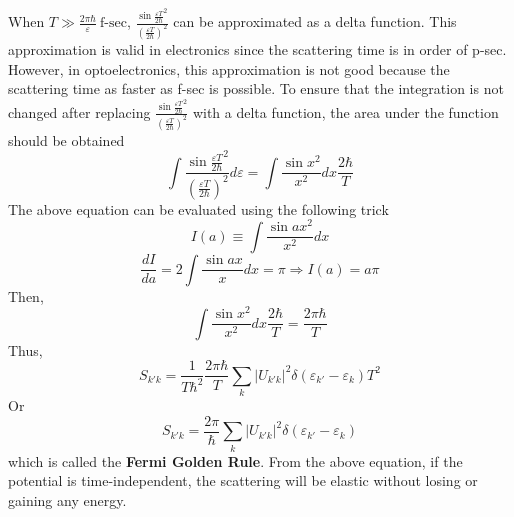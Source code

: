 When $T \gg \frac{2\pi\hbar}{\varepsilon} ~ \text{f-sec}$, $\frac{\sin{\frac{\varepsilon T}{2\hbar}}^{2}}{(\frac{\varepsilon T}{2\hbar})^{2}}$ can be approximated as a delta function. This approximation is valid in electronics since the scattering time is in order of p-sec. However, in optoelectronics, this approximation is not good because the scattering time as faster as f-sec is possible. To ensure that the integration is not changed after replacing $\frac{\sin{\frac{\varepsilon T}{2\hbar}}^{2}}{(\frac{\varepsilon T}{2\hbar})^{2}}$ with a delta function, the area under the function should be obtained \begin{equation}
    \int \frac{\sin{\frac{\varepsilon T}{2\hbar}}^{2}}{(\frac{\varepsilon T}{2\hbar})^{2}}d\varepsilon = \int \frac{\sin{x}^{2}}{x^{2}}dx \frac{2\hbar}{T}
\end{equation} The above equation can be evaluated using the following trick \begin{equation}
    I(a)\equiv \int\frac{\sin{ax}^{2}}{x^{2}}dx
\end{equation} \begin{equation}
    \frac{dI}{da} = 2\int \frac{\sin{ax}}{x}dx = \pi \Rightarrow I(a) = a\pi
\end{equation} Then, \begin{equation}
    \int \frac{\sin{x}^{2}}{x^{2}}dx \frac{2\hbar}{T} = \frac{2\pi\hbar}{T}
\end{equation} Thus, \begin{equation}
    S_{k'k} = \frac{1}{T\hbar^{2}}\frac{2\pi\hbar}{T}\sum_{k}{\big|U_{k'k}\big|^{2}\delta(\varepsilon_{k'}-\varepsilon_{k})}T^{2}\nonumber
\end{equation}
Or \begin{equation}
    \boxed{S_{k'k} = \frac{2\pi}{\hbar}\sum_{k}{\big|U_{k'k}\big|^{2}\delta(\varepsilon_{k'}-\varepsilon_{k})}}
\end{equation} which is called the {\bf Fermi Golden Rule}. From the above equation, if the potential is time-independent, the scattering will be elastic without losing or gaining any energy.
